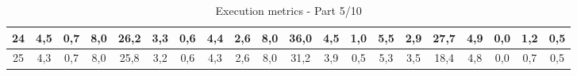 \begin{sidewaystable}[]
\begin{tabular}{|c|c|c|c|c|c|c|c|c|c|c|c|c|c|c|c|c|c|c|c|}
    24 & 4,5                                              & 0,7                                              & 8,0                                              & 26,2                                             & 3,3                                              & 0,6                                              & 4,4                                              & 2,6                                              & 8,0                                              & 36,0                                             & 4,5                                              & 1,0                                              & 5,5                                              & 2,9                                              & 27,7                                             & 4,9                                              & 0,0                                              & 1,2                                              & 0,5                                              \\ \hline
    25 & 4,3                                              & 0,7                                              & 8,0                                              & 25,8                                             & 3,2                                              & 0,6                                              & 4,3                                              & 2,6                                              & 8,0                                              & 31,2                                             & 3,9                                              & 0,5                                              & 5,3                                              & 3,5                                              & 18,4                                             & 4,8                                              & 0,0                                              & 0,7                                              & 0,5                                              \\ \hline
    \end{tabular}
    \caption{Execution metrics - Part 5/10}
    \label{tab:ap:exec_metrics_5}
\end{sidewaystable}


